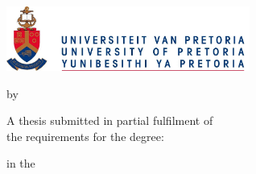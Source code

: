 \begin{titlepage}
    \begin{center}
        \includegraphics[width=0.6\textwidth]{1-front-matter/up-logo.jpg}
        
        \vspace*{1cm}

        \Large
        \MakeUppercase{\textbf{\doctitle}}
        
        \vspace{0.5cm}
        \large
        by \\
        \vspace{0.5cm}
            
        \authorname
            
        \vfill
            
        A thesis submitted in partial fulfilment of \\
        the requirements for the degree: \\
        
        \vspace{1cm}
        
        \degree
            
        \vspace{1cm}
            
        in the \\
        \vspace{0.5cm}            
        
        \large
        \faculty \\
        \vspace{0.5cm}
        
        \department \\
        \vspace{0.5cm}

        \university \\
        \country \\
        \vspace{0.5cm}
        \submissiondate
            
    \end{center}
\end{titlepage}